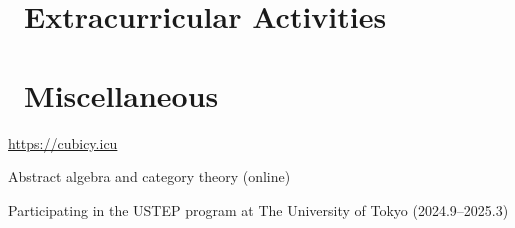 \documentclass{resume}
\begin{document}
\section{\faInfo\ Extracurricular Activities}


\section{\faInfo\ Miscellaneous}
\begin{description}[itemsep=0.5ex]
  \item[Personal Blog] \url{https://cubicy.icu}
  \item[Self-Learned Math Courses] Abstract algebra and category theory (online)
  \item[Exchange Program] Participating in the USTEP program at The University of Tokyo (2024.9--2025.3)
\end{description}
\end{document}
